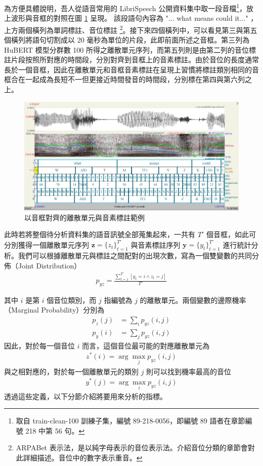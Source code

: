 {        為方便具體說明，吾人從語音常用的 LibriSpeech \cite{panayotov_librispeech_2015} 公開資料集中取一段音檔\footnote{取自 train-clean-100 訓練子集，編號 89-218-0056，即編號 89 語者在章節編號 218 中第 56 句。}，放上波形與音框的對照在圖 \ref{fig:enter-labelwav} 呈現。 該段語句內容為 "... what means could it..." ，上方兩個橫列為單詞標註、音位標註 \footnote{ARPABet 表示法，是以純字母表示的音位表示法。介紹音位分類的章節會對此詳細描述。音位中的數字表示重音。}。接下來四個橫列中，可以看見第三與第五個橫列將語句切割成以 20 毫秒為單位的片段，此即前面所述之音框。第三列為 HuBERT 模型分群數 100 所得之離散單元序列，而第五列則是由第二列的音位標註片段按照所對應的時間段，分別對齊到音框上的音素標註。由於音位的長度通常長於一個音框，因此在離散單元和音框音素標註在呈現上習慣將標註類別相同的音框合在一起成為長短不一但更接近時間發音的時間段，分別標在第四與第六列之上。
        \begin{figure}
            \centering
            \includegraphics[width=1\linewidth]{figures/praat.png}
            \caption{以音框對齊的離散單元與音素標註範例}
            \label{fig:enter-labelwav}
        \end{figure}
        
        此時若將整個待分析資料集的語音訊號全部蒐集起來，一共有 $T'$ 個音框，如此可分別獲得一個離散單元序列 $\boldsymbol{z} = \{z_t\}_{t=1}^{T'}$ 與音素標註序列 $\boldsymbol{y} = \{y_t\}_{t=1}^{T'}$ 進行統計分析。我們可以根據離散單元與標註之間配對的出現次數，寫為一個雙變數的共同分佈（Joint Distribution）
\begin{align}
    p_{yz} = \frac{\sum^{T'}_{t=1}[{y_t = i \wedge z_t = j}]}{T'}
\end{align}

其中 $i$ 是第 $i$ 個音位類別，而 $j$ 指編號為 $j$ 的離散單元。兩個變數的邊際機率（Marginal Probability）分別為
\begin{align}
    p_z(j) & =\sum_i{p_{yz}(i, j)} \\
    p_y(i) & =\sum_j{p_{yz}(i, j)}
\end{align}
因此，對於每一個音位 $i$ 而言，這個音位最可能的對應離散單元為
\begin{align}
    z^\ast(i) = \arg\max_j p_{yz}(i, j)
\end{align}
與之相對應的，對於每一個離散單元的類別 $j$ 則可以找到機率最高的音位
\begin{align}
    y^\ast(j) = \arg\max_i p_{yz}(i,j)
\end{align}
透過這些定義，以下分節介紹將要用來分析的指標。

}
